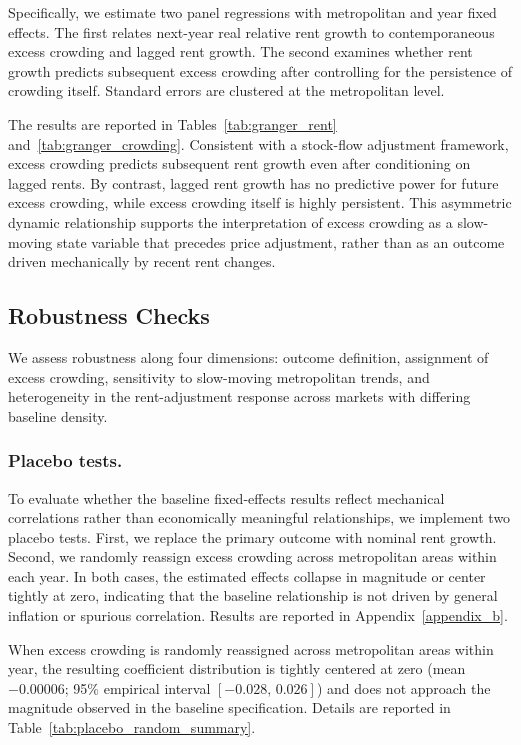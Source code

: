 \documentclass[pdflatex,sn-basic]{sn-jnl}%
\theoremstyle{thmstyleone}%
\theoremstyle{thmstyletwo}%
\theoremstyle{thmstylethree}%
\begin{document}
Specifically, we estimate two panel regressions with metropolitan and year fixed
effects. The first relates next-year real relative rent growth to contemporaneous excess
crowding and lagged rent growth. The second examines whether rent growth predicts
subsequent excess crowding after controlling for the persistence of crowding itself.
Standard errors are clustered at the metropolitan level.

The results are reported in Tables~\ref{tab:granger_rent} and~\ref{tab:granger_crowding}.
Consistent with a stock-flow adjustment framework, excess crowding predicts subsequent
rent growth even after conditioning on lagged rents. By contrast, lagged rent growth has
no predictive power for future excess crowding, while excess crowding itself is highly
persistent. This asymmetric dynamic relationship supports the interpretation of excess
crowding as a slow-moving state variable that precedes price adjustment, rather than as
an outcome driven mechanically by recent rent changes.

\subsection{Robustness Checks}

We assess robustness along four dimensions: outcome definition, assignment of excess
crowding, sensitivity to slow-moving metropolitan trends, and heterogeneity in the
rent-adjustment response across markets with differing baseline density.

\subsubsection{Placebo tests.}
To evaluate whether the baseline fixed-effects results reflect mechanical correlations
rather than economically meaningful relationships, we implement two placebo tests.
First, we replace the primary outcome with nominal rent growth. Second, we randomly
reassign excess crowding across metropolitan areas within each year. In both cases,
the estimated effects collapse in magnitude or center tightly at zero, indicating that
the baseline relationship is not driven by general inflation or spurious correlation.
Results are reported in Appendix~\ref{appendix_b}.

When excess crowding is randomly reassigned across metropolitan areas within year,
the resulting coefficient distribution is tightly centered at zero (mean $-0.00006$;
95\% empirical interval $[-0.028,\,0.026]$) and does not approach the magnitude observed
in the baseline specification. Details are reported in Table~\ref{tab:placebo_random_summary}.
\end{document}
